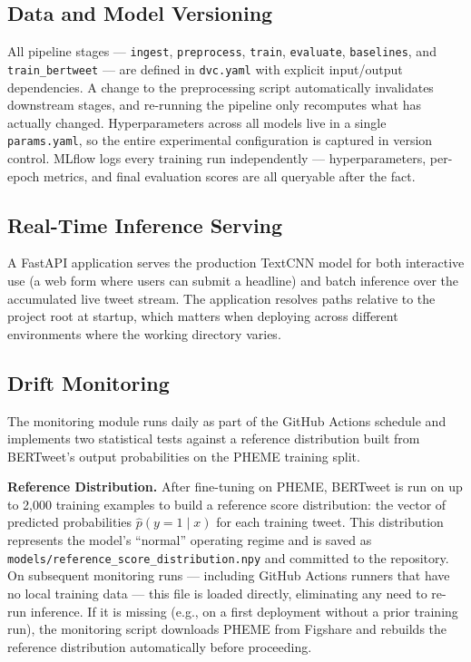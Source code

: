 \documentclass[sigconf]{acmart}
\begin{document}
\subsection{Data and Model Versioning}

All pipeline stages — \texttt{ingest}, \texttt{preprocess}, \texttt{train}, \texttt{evaluate},
\texttt{baselines}, and \texttt{train\_bertweet} — are defined in \texttt{dvc.yaml} with
explicit input/output dependencies. A change to the preprocessing script automatically
invalidates downstream stages, and re-running the pipeline only recomputes what has actually
changed. Hyperparameters across all models live in a single \texttt{params.yaml}, so the
entire experimental configuration is captured in version control. MLflow logs every training
run independently — hyperparameters, per-epoch metrics, and final evaluation scores are all
queryable after the fact.

\subsection{Real-Time Inference Serving}

A FastAPI application serves the production TextCNN model for both interactive use (a web
form where users can submit a headline) and batch inference over the accumulated live tweet
stream. The application resolves paths relative to the project root at startup, which matters
when deploying across different environments where the working directory varies.

\subsection{Drift Monitoring}
\label{sec:drift_monitoring}

The monitoring module runs daily as part of the GitHub Actions schedule and implements two
statistical tests against a reference distribution built from BERTweet's output probabilities
on the PHEME training split.

\textbf{Reference Distribution.} After fine-tuning on PHEME, BERTweet is run on up to 2,000
training examples to build a reference score distribution: the vector of predicted
probabilities $\hat{p}(y=1\mid x)$ for each training tweet. This distribution represents
the model's ``normal'' operating regime and is saved as \texttt{models/reference\_score\_distribution.npy}
and committed to the repository. On subsequent monitoring runs — including GitHub Actions
runners that have no local training data — this file is loaded directly, eliminating any
need to re-run inference. If it is missing (e.g., on a first deployment without a prior
training run), the monitoring script downloads PHEME from Figshare and rebuilds the
reference distribution automatically before proceeding.
\end{document}
